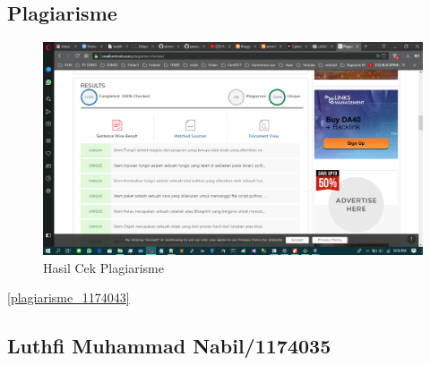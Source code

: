 		\subsection{Plagiarisme}
			\begin{figure} [ht]
					\centerline{\includegraphics[width=1\textwidth]{figures/chapter3/plagiarisme_1174043.png}}
					\caption{Hasil Cek Plagiarisme}
					\label{plagiarisme}
				\end{figure}

			\ref{plagiarisme_1174043}

\subsection{Luthfi Muhammad Nabil/1174035}
